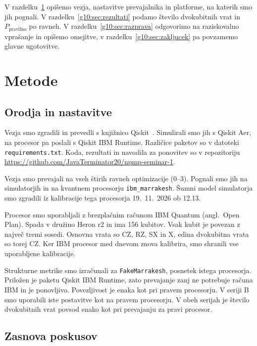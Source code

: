 \documentclass[graybox, envcountchap]{svmult}
\begin{document}
V razdelku~\ref{g10:sec:metode} opišemo vezja,
nastavitve prevajalnika in platforme, na katerih smo jih pognali.
V razdelku~\ref{g10:sec:rezultati} podamo število dvokubitnih vrat
in $P_\text{pravilno}$ po ravneh.
V razdelku~\ref{g10:sec:razprava} odgovorimo na raziskovalno vprašanje
in opišemo omejitve,
v razdelku~\ref{g10:sec:zakljucek} pa povzamemo glavne ugotovitve.


\section{Metode}
\label{g10:sec:metode}

\subsection{Orodja in nastavitve}
\label{g10:sec:orodja}

Vezja smo zgradili in prevedli s knjižnico Qiskit~\cite{qiskit2024}.
Simulirali smo jih s Qiskit Aer,
na procesor pa poslali s Qiskit IBM Runtime.
Različice paketov so v datoteki \texttt{requirements.txt}.
Koda, rezultati in navodila za ponovitev so v repozitoriju
\url{https://github.com/JavaTerminator20/npmp-seminar-1}.

Vezja smo prevajali na vseh štirih ravneh optimizacije (0--3).
Pognali smo jih na simulatorjih
in na kvantnem procesorju \texttt{ibm\_marrakesh}.
Šumni model simulatorja smo zgradili iz kalibracije tega procesorja
19.~11.~2026 ob 12.13.

Procesor smo uporabljali z brezplačnim računom IBM Quantum
(angl.\ Open Plan).
Spada v družino Heron r2 in ima 156 kubitov.
Vsak kubit je povezan z največ tremi sosedi.
Osnovna vrata so CZ, RZ, SX in X,
edina dvokubitna vrata so torej CZ.
Ker IBM procesor med dnevom znova kalibrira,
smo shranili vse uporabljene kalibracije.

Strukturne metrike smo izračunali za \texttt{FakeMarrakesh},
posnetek istega procesorja.
Priložen je paketu Qiskit IBM Runtime, zato
prevajanje zanj ne potrebuje računa IBM in je ponovljivo.
Povezljivost je enaka kot pri pravem procesorju.
V seriji B smo uporabili iste postavitve
kot na pravem procesorju.
V obeh serijah je število dvokubitnih vrat
povsod enako kot pri prevajanju za pravi procesor.


\subsection{Zasnova poskusov}
\label{g10:sec:poskusi}
\end{document}
